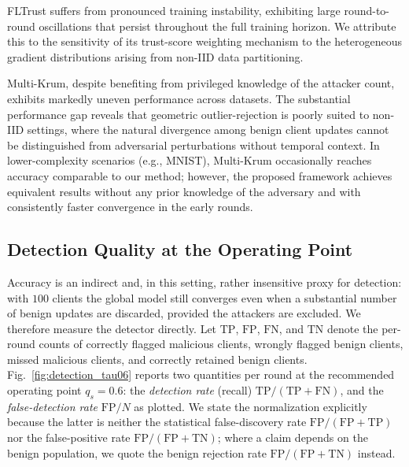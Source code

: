 \documentclass[journal]{IEEEtran}
\begin{document}
FLTrust suffers from pronounced training instability, exhibiting large round-to-round oscillations that persist throughout the full training horizon. We attribute this to the sensitivity of its trust-score weighting mechanism to the heterogeneous gradient distributions arising from non-IID data partitioning.

Multi-Krum, despite benefiting from privileged knowledge of the attacker count, exhibits markedly uneven performance across datasets. The substantial performance gap reveals that geometric outlier-rejection is poorly suited to non-IID settings, where the natural divergence among benign client updates cannot be distinguished from adversarial perturbations without temporal context. In lower-complexity scenarios (e.g., MNIST), Multi-Krum occasionally reaches accuracy comparable to our method; however, the proposed framework achieves equivalent results without any prior knowledge of the adversary and with consistently faster convergence in the early rounds.


\subsection{Detection Quality at the Operating Point}
\label{sec:detection_quality}

Accuracy is an indirect and, in this setting, rather insensitive proxy for detection: with $100$ clients the global model still converges even when a substantial number of benign updates are discarded, provided the attackers are excluded. We therefore measure the detector directly. Let $\mathrm{TP}$, $\mathrm{FP}$, $\mathrm{FN}$, and $\mathrm{TN}$ denote the per-round counts of correctly flagged malicious clients, wrongly flagged benign clients, missed malicious clients, and correctly retained benign clients. Fig.~\ref{fig:detection_tau06} reports two quantities per round at the recommended operating point $q_s = 0.6$: the \emph{detection rate} (recall) $\mathrm{TP}/(\mathrm{TP}+\mathrm{FN})$, and the \emph{false-detection rate} $\mathrm{FP}/N$ as plotted. We state the normalization explicitly because the latter is neither the statistical false-discovery rate $\mathrm{FP}/(\mathrm{FP}+\mathrm{TP})$ nor the false-positive rate $\mathrm{FP}/(\mathrm{FP}+\mathrm{TN})$; where a claim depends on the benign population, we quote the benign rejection rate $\mathrm{FP}/(\mathrm{FP}+\mathrm{TN})$ instead.
\end{document}
